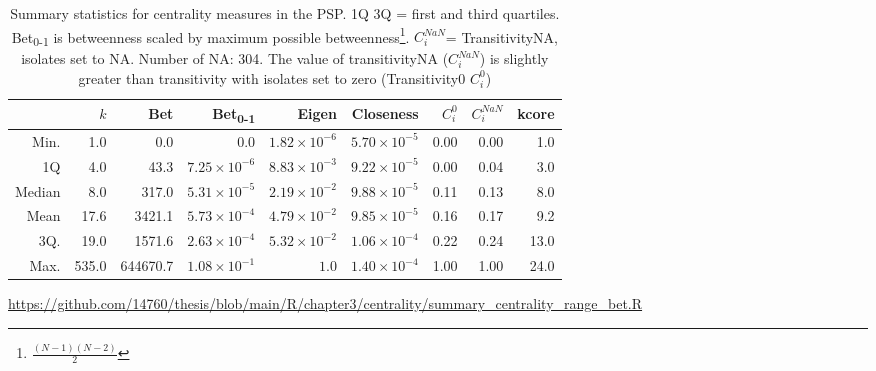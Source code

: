 \begin{table}[ht]
\centering

\begin{adjustbox}{width=\textwidth}
    \setlength{\extrarowheight}{2pt}
\begin{tabular}{rrrrrrrrr}
  \toprule
 & $k$ & Bet & Bet\textsubscript{0-1} & Eigen & Closeness & $C^0_i$ & $C^{NaN}_i$ & kcore \\ 
  \midrule
Min. & 1.0 & 0.0 & $0.0$ & $1.82 \times 10^{-6}$ & $5.70 \times 10^{-5}$ & 0.00 & 0.00 & 1.0 \\ 
  1Q & 4.0 & 43.3 & $7.25 \times 10^{-6}$ & $8.83 \times 10^{-3}$ & $9.22 \times 10^{-5}$ & 0.00 & 0.04 & 3.0 \\ 
  Median & 8.0 & 317.0 & $5.31 \times 10^{-5}$ & $2.19 \times 10^{-2}$ & $9.88 \times 10^{-5}$ & 0.11 & 0.13 & 8.0 \\ 
  Mean & 17.6 & 3421.1 & $5.73 \times 10^{-4}$ & $4.79 \times 10^{-2}$ & $9.85 \times 10^{-5}$ & 0.16 & 0.17 & 9.2 \\ 
  3Q. & 19.0 & 1571.6 & $2.63 \times 10^{-4}$ & $5.32 \times 10^{-2}$ & $1.06 \times 10^{-4}$ & 0.22 & 0.24 & 13.0 \\ 
  Max. & 535.0 & 644670.7 & $1.08 \times 10^{-1}$ & $1.0 $ & $1.40 \times 10^{-4}$ & 1.00 & 1.00 & 24.0 \\ 
   \bottomrule
\end{tabular}
\end{adjustbox}
\caption[Summary centrality statistics]{Summary statistics for centrality measures in the PSP. 1Q 3Q = first and third quartiles. Bet\textsubscript{0-1} is betweenness scaled by maximum possible betweenness\footnote{$\frac{(N-1)(N-2)}{2}$}. $C^{NaN}_i$= TransitivityNA, isolates set to NA. Number of NA: 304. The value of transitivityNA ($C_i^{NaN}$) is slightly greater than transitivity with isolates set to zero (Transitivity0 $C_i^0$)}
\tiny\url{https://github.com/14760/thesis/blob/main/R/chapter3/centrality/summary_centrality_range_bet.R}
\label{Table:Summary of centrality measures1}
\end{table}







